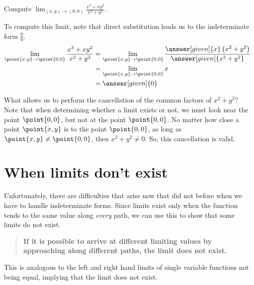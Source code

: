 \documentclass{ximera}
\begin{document}
\begin{example}
  Compute $\lim_{(x,y)\to(0,0) }\frac{x^3+xy^2}{x^2+y^2}$. 
  \begin{explanation}
   To compute this limit, note that direct substitution leads us to the indeterminate form $\frac{0}{0}$.      
    \begin{align*}
      \lim_{\point{x,y}\to\point{0,0}}\frac{x^3+xy^2}{x^2+y^2}
      &=\lim_{\point{x,y}\to\point{0,0}} \frac{\answer[given]{x}\left(x^2+y^2\right)}{\answer[given]{x^2+y^2}}\\
      &=\lim_{\point{x,y}\to\point{0,0}} x\\
      &=\answer[given]{0}
    \end{align*}
    
    What allows us to perform the cancellation of the common factors of $x^2+y^2$?  Note that when determining whether a limit exists or not, we must look near the point $\point{0,0}$, but not at the point $\point{0,0}$.  No matter how close a point  $\point{x,y}$ is to the point $\point{0,0}$, as long as  $\point{x,y} \neq \point{0,0}$, then $x^2+y^2 \neq 0$. So, this cancellation is valid.
  \end{explanation}
\end{example}

\section{When limits don't exist}
Unfortunately, there are difficulties that arise now that did not before when we have to handle indeterminate forms.  Since limits exist only when the function tends to the same value along \emph{every} path, we can use this to show that some limits do not exist.  

\begin{quote}
  \textbf{If it is possible to arrive at different limiting values by
    approaching along different paths, the limit does not exist.}
\end{quote}

This is analogous to the left and right hand limits of single variable
functions not being equal, implying that the limit does not exist.
 
\end{document}
